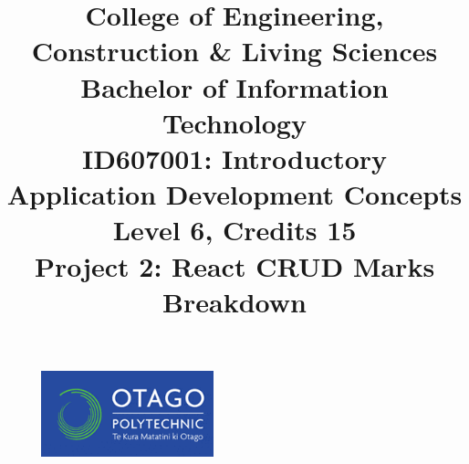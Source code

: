 \documentclass{article}
\author{}
\begin{document}
\begin{figure}
  \centering
  \includegraphics[width=50mm]{../img/logo.png}
\end{figure}

\title{College of Engineering, Construction \& Living Sciences\\Bachelor of Information Technology\\ID607001: Introductory Application Development Concepts\\Level 6, Credits 15\\\textbf{Project 2: React CRUD Marks Breakdown}}
\date{}
\maketitle
\end{document}
